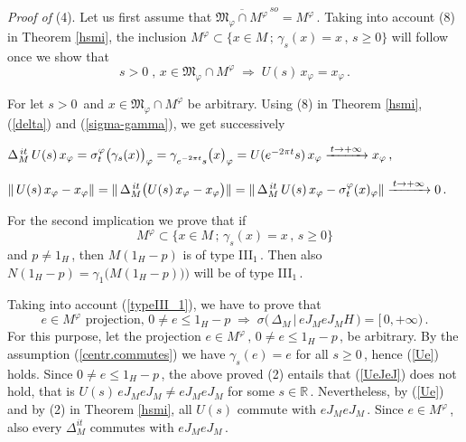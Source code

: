 \documentclass[reqno]{amsart}
\theoremstyle{definition}
\theoremstyle{remark}
\numberwithin{equation}{section}
\theoremstyle{plain}
\begin{document}
{\it Proof of }(4). Let us first assume that
$\overline{\mathfrak M_\varphi\cap M^\varphi}^{\, so}= M^\varphi\,$.
Taking into account (8) in Theorem \ref{hsmi}, the inclusion
$M^\varphi\subset\big\{ x\in M\, ;\,\gamma_s (x) =x\, ,\, s\geq 0
\big\}$ will follow once we show that
\begin{equation*}
s>0\; ,\, x\in \mathfrak M_\varphi\cap M^\varphi\;\Longrightarrow\;
U(s)\, x_\varphi =x_\varphi\, .
\end{equation*}

For let $s>0\,$ and $x\in \mathfrak M_\varphi\cap M^\varphi$ be
arbitrary. Using (8) in Theorem \ref{hsmi}, (\ref{delta}) and
(\ref{sigma-gamma}), we get successively
\smallskip
\begin{center}
$\Delta_M^{\, it}\, U(s)\, x_\varphi =\sigma^\varphi_t\big(\gamma_s
(x)\big)_\varphi =\gamma_{\substack{{}\\ {e^{-2\pi t} s}}}
\big( x\big)_\varphi = U(e^{-2\pi t} s)\, x_\varphi
\buildrel {t\to +\infty\,}\over{\hbox to1.2cm{\rightarrowfill}}
x_\varphi\, ,$
\end{center}
\smallskip
\begin{center}
$\|\, U(s)\, x_\varphi - x_\varphi\| =\|\,\Delta_M^{\, it} \big(
U(s)\, x_\varphi - x_\varphi \big)\| =\|\,\Delta_M^{\, it}\,
U(s)\, x_\varphi -\sigma^\varphi_t(x)_\varphi\|
\buildrel {t\to +\infty\,}\over{\hbox to1.2cm{\rightarrowfill}}
0\, .$
\end{center}
\smallskip

For the second implication we prove that if
\begin{equation}\label{centr.commutes}
M^\varphi\subset\big\{ x\in M\, ;\,\gamma_s (x) =x\, ,\,
s\geq 0\big\}
\end{equation}
and $p\neq 1_H\,$, then $M (1_H-p)$ is of type III$_1\,$. Then also
$N(1_H-p) =\gamma_1\big( M(1_H-p))\big)$ will be of type III$_1\,$.

Taking into account (\ref{typeIII_1}), we have to prove that
\begin{equation*}
e\in M^\varphi\text{ projection},\, 0\neq e\leq 1_H-p\;
\Longrightarrow\;\sigma \big(\,\Delta_M\, |\, e J_M e J_M H\,\big) =
[\, 0,+\infty )\, .
\end{equation*}
For this purpose, let the projection $e\in M^\varphi\, ,\, 0\neq
e\leq 1_H-p\,$, be arbitrary. By the assumption (\ref{centr.commutes})
we have $\gamma_s (e) =e$ for all $s\geq 0\,$, hence (\ref{Ue}) holds.
Since $0\neq e\leq 1_H-p\,$, the above proved (2) entails that
(\ref{UeJeJ}) does not hold, that is $U(s)\, eJ_M eJ_M\neq
eJ_M eJ_M$ for some $s\in\mathbb R\,$. Nevertheless, by (\ref{Ue})
and by (2) in Theorem \ref{hsmi}, all $U(s)$ commute with
$eJ_M eJ_M\,$. Since $e\in M^\varphi\,$, also every $\Delta_M^{it}$
commutes with $eJ_M eJ_M\,$.
\end{document}

